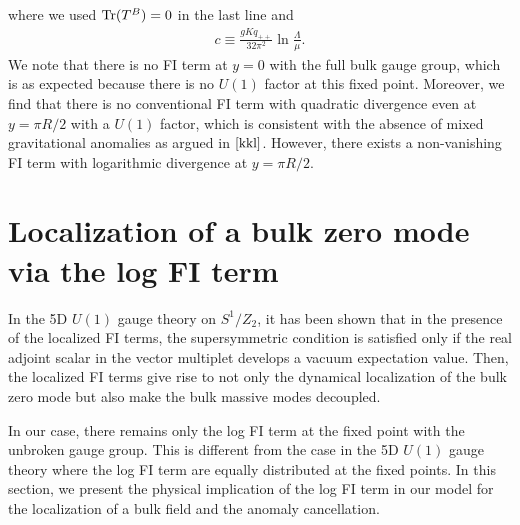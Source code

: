 \documentclass[a4paper,12pt]{article}
\begin{document}
where we used ${\rm Tr}(T^B)=0$ in the last line and
\begin{eqnarray}
c\equiv \frac{gKq_{++}}{32\pi^2}\ln\frac{\Lambda}{\mu}.
\end{eqnarray}
We note that there is no FI term at $y=0$ with the full bulk gauge group,
which is as expected because there
is no $U(1)$ factor at this fixed point. Moreover, we find that there is no
conventional FI term with quadratic divergence even at $y=\pi R/2$
with a $U(1)$ factor, which is
consistent with the absence of mixed gravitational anomalies as argued
in $\cite{kkl}$. However, there exists a non-vanishing FI term
with logarithmic divergence at $y=\pi R/2$.



\section{Localization of a bulk zero mode via the log FI term}

In the 5D $U(1)$ gauge theory on $S^1/Z_2$, it has been shown that 
in the presence of the localized FI terms, 
the supersymmetric condition is satisfied
only if the real adjoint scalar in the vector multiplet develops
a vacuum expectation value\cite{peskin,ah2,barbieri,nilles}. 
Then, the localized FI
terms give rise to  not only the dynamical localization of the bulk zero mode  
but also make the bulk massive modes decoupled\cite{nilles}. 

In our case, there remains only the log FI term
at the fixed point with the unbroken gauge group.
This is different from the case in the 5D $U(1)$ gauge theory 
where the log FI term are equally distributed at the fixed points\cite{nilles}.
In this section, we present the physical implication of the log FI term in our
model for the localization of a bulk field and the anomaly cancellation. 
  
\end{document}
